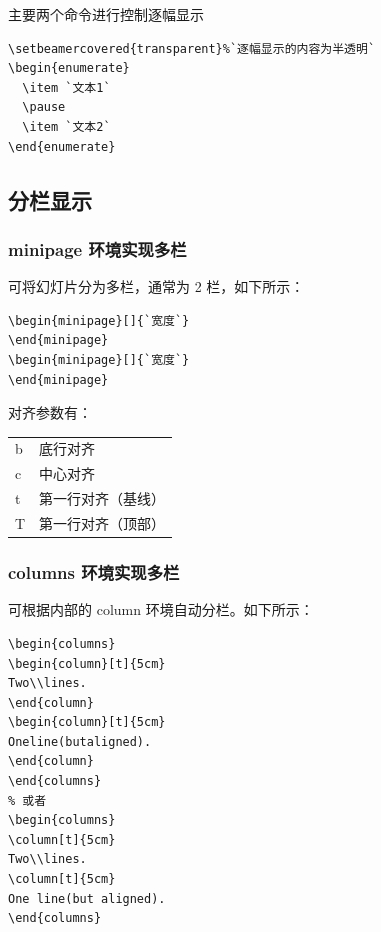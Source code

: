 
主要两个命令进行控制逐幅显示
\begin{lstlisting}[language={[LaTeX]TeX}]
\setbeamercovered{transparent}%`逐幅显示的内容为半透明`
\begin{enumerate}
  \item `文本1`
  \pause
  \item `文本2`
\end{enumerate}
\end{lstlisting}


\subsection{分栏显示}
\subsubsection{minipage 环境实现多栏}

可将幻灯片分为多栏，通常为 2 栏，如下所示：
\begin{lstlisting}[language={[LaTeX]TeX}]
\begin{minipage}[]{`宽度`}
\end{minipage}
\begin{minipage}[]{`宽度`}
\end{minipage}
\end{lstlisting}

对齐参数有：\\
\begin{tabular}{ll}

  b & 底行对齐 \\
  c & 中心对齐 \\
  t & 第一行对齐（基线） \\
  T & 第一行对齐（顶部） \\

\end{tabular}
\subsubsection{columns 环境实现多栏}
可根据内部的 column 环境自动分栏。如下所示：
\begin{lstlisting}
\begin{columns}
\begin{column}[t]{5cm}
Two\\lines.
\end{column}
\begin{column}[t]{5cm}
Oneline(butaligned).
\end{column}
\end{columns}
% 或者
\begin{columns}
\column[t]{5cm}
Two\\lines.
\column[t]{5cm}
One line(but aligned).
\end{columns}
\end{lstlisting}

